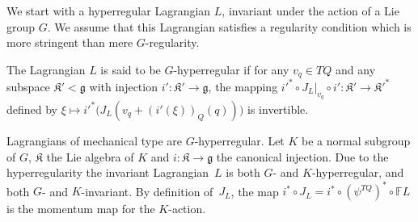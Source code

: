 \documentclass[pdftex]{sigma}
\newcommand{\lag}{\mathfrak{g}}
\newcommand{\lak}{\mathfrak{K}}
\newcommand{\F}{\mathbb{F}}
\begin{document}
We start with a hyperregular Lagrangian $L$, invariant under the action of a Lie group $G$. We assume that this Lagrangian satisf\/ies a regularity condition which is more stringent than mere $G$-regularity.
\begin{definition} The Lagrangian $L$ is said to be $G$-hyperregular if for any $v_q\in TQ$ and any subspace $\lak' <\lag$ with injection $i':\lak'\to \lag$,  the mapping ${i'}^*\circ J_L|_{v_q}\circ i':\lak' \to \lak'^*$ def\/ined by $\xi \mapsto {i'}^*\big(J_L(v_q+(i'(\xi))_Q(q))\big)$ is invertible.
\end{definition}
Lagrangians of mechanical type are $G$-hyperregular. Let $K$ be a normal subgroup of $G$, $\lak$ the Lie algebra of $K$ and $i:\lak\to \lag$ the canonical injection. Due to the hyperregularity the invariant Lagrangian~$L$ is both $G$- and $K$-hyperregular, and both $G$- and $K$-invariant. By def\/inition of~$J_L$, the map $i^*\circ J_L= i^*\circ (\psi^{TQ})^*\circ \F L$ is the momentum map for the $K$-action.
\end{document}
